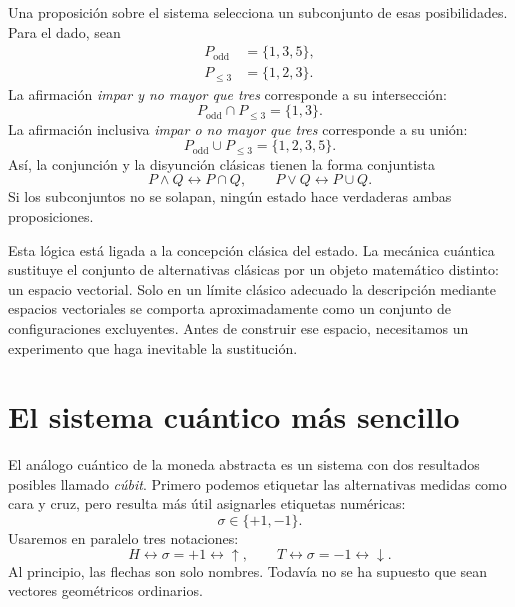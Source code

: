 Una proposición sobre el sistema selecciona un subconjunto de esas posibilidades. Para el dado, sean
\begin{align}
  P_{\mathrm{odd}}&=\{1,3,5\},\\
  P_{\leq 3}&=\{1,2,3\}.
\end{align}
La afirmación \emph{impar y no mayor que tres} corresponde a su intersección:
\begin{equation}
  P_{\mathrm{odd}}\cap P_{\leq 3}=\{1,3\}.
\end{equation}
La afirmación inclusiva \emph{impar o no mayor que tres} corresponde a su unión:
\begin{equation}
  P_{\mathrm{odd}}\cup P_{\leq 3}
  =
  \{1,2,3,5\}.
\end{equation}
Así, la conjunción y la disyunción clásicas tienen la forma conjuntista
\begin{equation}
  P\wedge Q\longleftrightarrow P\cap Q,
  \qquad
  P\vee Q\longleftrightarrow P\cup Q.
\end{equation}
Si los subconjuntos no se solapan, ningún estado hace verdaderas ambas proposiciones.

Esta lógica está ligada a la concepción clásica del estado. La mecánica cuántica sustituye el conjunto de alternativas clásicas por un objeto matemático distinto: un espacio vectorial. Solo en un límite clásico adecuado la descripción mediante espacios vectoriales se comporta aproximadamente como un conjunto de configuraciones excluyentes. Antes de construir ese espacio, necesitamos un experimento que haga inevitable la sustitución.

\section{El sistema cuántico más sencillo}

El análogo cuántico de la moneda abstracta es un sistema con dos resultados posibles llamado \emph{cúbit}. Primero podemos etiquetar las alternativas medidas como cara y cruz, pero resulta más útil asignarles etiquetas numéricas:
\begin{equation}
  \sigma\in\{+1,-1\}.
\end{equation}
Usaremos en paralelo tres notaciones:
\begin{equation}
  H\longleftrightarrow \sigma=+1\longleftrightarrow\uparrow,
  \qquad
  T\longleftrightarrow \sigma=-1\longleftrightarrow\downarrow.
\end{equation}
Al principio, las flechas son solo nombres. Todavía no se ha supuesto que sean vectores geométricos ordinarios.

